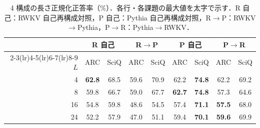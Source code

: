 \documentclass[techrep,noauthor]{ipsj}
\newcommand{\rev}[1]{{\color{blue}#1}}
\newcommand{\revr}[1]{{\color{red}#1}}
\begin{document}
\begin{table}[!t]\centering\small
\caption{\rev{4 構成の長さ正規化正答率（\%）．各行・各課題の最大値を太字で示す．\revr{R 自己：RWKV 自己再構成対照，P 自己：Pythia 自己再構成対照，}R$\to$P：RWKV$\to$Pythia，P$\to$R：Pythia$\to$RWKV．}}\label{tab:direction}
\setlength{\tabcolsep}{2.4pt}
{\color{blue}
\begin{tabular}{rcccccccc}\toprule
& \multicolumn{2}{c}{\textsf{R 自己}} & \multicolumn{2}{c}{\textsf{R$\to$P}}
& \multicolumn{2}{c}{\textsf{P 自己}} & \multicolumn{2}{c}{\textsf{P$\to$R}}\\
\cmidrule(lr){2-3}\cmidrule(lr){4-5}\cmidrule(lr){6-7}\cmidrule(lr){8-9}
$L$ & ARC & SciQ & ARC & SciQ & ARC & SciQ & ARC & SciQ\\\midrule
4  & \textbf{62.8} & 68.5 & 59.6 & 70.9 & 62.2 & \textbf{74.8} & 62.2 & 69.2\\
8  & 59.8 & 66.7 & 59.0 & 67.7 & \textbf{62.7} & \textbf{74.8} & 57.3 & 64.6\\
16 & 54.8 & 59.8 & 48.6 & 54.5 & 57.4 & \textbf{71.1} & \textbf{57.5} & 68.0\\
24 & 52.2 & 57.9 & 47.0 & 51.1 & 59.4 & \textbf{70.1} & \textbf{59.6} & 69.9\\\bottomrule
\end{tabular}}
\end{table}
\end{document}

